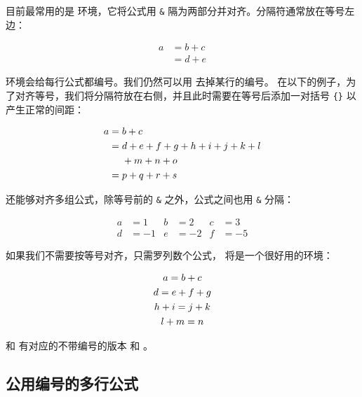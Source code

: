 目前最常用的是  环境，它将公式用 \texttt\& 隔为两部分并对齐。分隔符通常放在等号左边：

\begin{codeshow}
    \begin{align}
        a & = b + c \\
          & = d + e
    \end{align}
\end{codeshow}

 环境会给每行公式都编号。我们仍然可以用  去掉某行的编号。
在以下的例子，为了对齐等号，我们将分隔符放在右侧，并且此时需要在等号后添加一对括号 \texttt\{\texttt\} 以产生正常的间距：

\begin{codeshow}
    \begin{align}
        a ={} & b + c                 \\
        ={}   & d + e + f + g + h + i
        + j + k + l \notag            \\
              & + m + n + o           \\
        ={}   & p + q + r + s
    \end{align}
\end{codeshow}

 还能够对齐多组公式，除等号前的 \texttt\& 之外，公式之间也用 \texttt\& 分隔：

\begin{codeshow}
    \begin{align}
        a & =1  & b & =2  & c & =3  \\
        d & =-1 & e & =-2 & f & =-5
    \end{align}
\end{codeshow}

如果我们不需要按等号对齐，只需罗列数个公式， 将是一个很好用的环境：

\begin{codeshow}
    \begin{gather}
        a = b + c \\
        d = e + f + g \\
        h + i = j + k \notag \\
        l + m = n
    \end{gather}
\end{codeshow}

 和  有对应的不带编号的版本  和 。

\subsection{公用编号的多行公式}\label{subsec:aligned}

